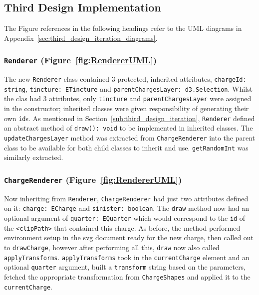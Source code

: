 \documentclass[nobib, a4paper, twoside, justified]{tufte-book}
\makeatletter
\newcommand{\svg}{\gls{svg}\@\xspace}
\newcommand{\charge}{\gls{charge}\@\xspace}
\makeatother
\begin{document}
\subsection{Third Design Implementation}%
\label{sub:third_design_implementation}

The Figure references in the following headings refer to the UML diagrams in
Appendix~\ref{sec:third_design_iteration_diagrams}.

\subsubsection{\texttt{Renderer} (Figure~\ref{fig:RendererUML})}%
\label{ssub:renderer}

The new \texttt{Renderer} class contained 3 protected, inherited attributes, \texttt{chargeId:
string}, \texttt{tincture: ETincture} and \texttt{parentChargesLayer: d3.Selection}. Whilst the
clas had 3 attributes, only \texttt{tincture} and \texttt{parentChargesLayer} were assigned in the
constructor; inherited classes were given responsibility of generating their own \texttt{id}s. As
mentioned in Section~\ref{sub:third_design_iteration}, \texttt{Renderer} defined an abstract method
of \texttt{draw(): void} to be implemented in inherited classes. The \texttt{updateChargesLayer}
method was extracted from \texttt{ChargeRenderer} into the parent class to be available for both
child classes to inherit and use. \texttt{getRandomInt} was similarly extracted.

\subsubsection{\texttt{ChargeRenderer} (Figure~\ref{fig:RendererUML})}%
\label{ssub:chargerenderer}

Now inheriting from \texttt{Renderer}, \texttt{ChargeRenderer} had just two attributes defined on
it: \texttt{charge: ECharge} and \texttt{sinister: boolean}. The \texttt{draw} method now had an
optional argument of \texttt{quarter: EQuarter} which would correspond to the \texttt{id} of the
\texttt{<clipPath>} that contained this \charge. As before, the method performed environment setup
in the \svg document ready for the new \charge, then called out to \texttt{drawCharge}, however
after performing all this, \texttt{draw} now also called \texttt{applyTransforms}.
\texttt{applyTransforms} took in the \texttt{currentCharge} element and an optional
\texttt{quarter} argument, built a \texttt{transform} string based on the parameters, fetched the
appropriate transformation from \texttt{ChargeShapes} and applied it to the \texttt{currentCharge}.
\end{document}
